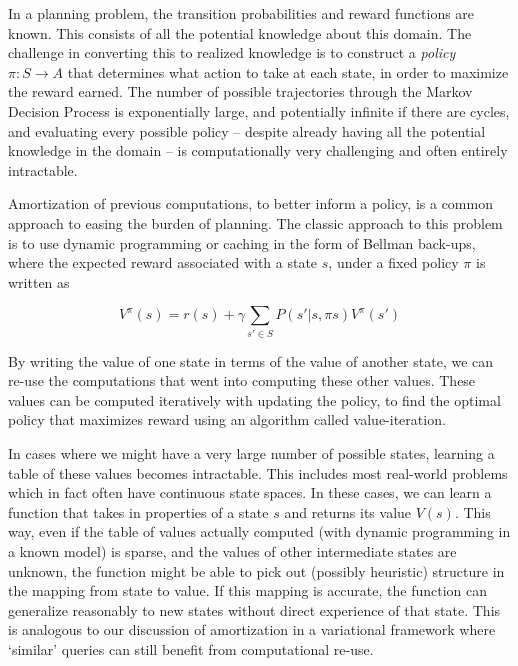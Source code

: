 
In a planning problem, the transition probabilities and reward functions are known. This consists of all the potential knowledge about this domain. The challenge in converting this to realized knowledge is to construct a \textit{policy} $\pi: S \rightarrow A$ that determines what action to take at each state, in order to maximize the reward earned. The number of possible trajectories through the Markov Decision Process is exponentially large, and potentially infinite if there are cycles, and evaluating every possible policy -- despite already having all the potential knowledge in the domain -- is computationally very challenging and often entirely intractable. 

Amortization of previous computations, to better inform a policy, is a common approach to easing the burden of planning. The classic approach to this problem is to use dynamic programming or caching in the form of Bellman back-ups, where the expected reward associated with a state $s$, under a fixed policy $\pi$ is written as

\begin{equation}
V^{\pi}(s) = r(s) + \gamma \sum_{s' \in S} P(s' | s, \pi{s}) V^{\pi}(s')
\end{equation}

By writing the value of one state in terms of the value of another state, we can re-use the computations that went into computing these other values. These values can be computed iteratively with updating the policy, to find the optimal policy that maximizes reward using an algorithm called value-iteration. 

In cases where we might have a very large number of possible states, learning a table of these values becomes intractable. This includes most real-world problems which in fact often have continuous state spaces. In these cases, we can learn a function that takes in properties of a state $s$ and returns its value $V(s)$. This way, even if the table of values actually computed (with dynamic programming in a known model) is sparse, and the values of other intermediate states are unknown, the function might be able to pick out (possibly heuristic) structure in the mapping from state to value. If this mapping is accurate, the function can generalize reasonably to new states without direct experience of that state. This is analogous to our discussion of amortization in a variational framework where `similar' queries can still benefit from computational re-use.

